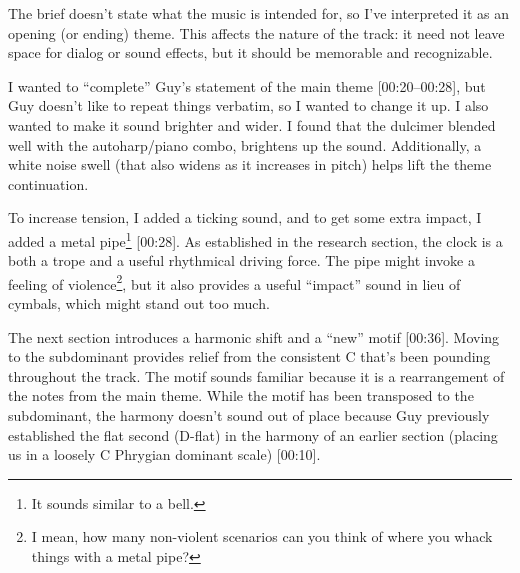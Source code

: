 
%

%
%
%

The brief doesn't state what the music is intended for, so I've interpreted it as an opening (or ending) theme. This affects the nature of the track: it need not leave space for dialog or sound effects, but it should be memorable and recognizable.

I wanted to ``complete'' Guy's statement of the main theme [00:20--00:28], but Guy doesn't like to repeat things verbatim, so I wanted to change it up. I also wanted to make it sound brighter and wider. I found that the dulcimer blended well with the autoharp/piano combo, brightens up the sound. Additionally, a white noise swell (that also widens as it increases in pitch) helps lift the theme continuation.

To increase tension, I added a ticking sound, and to get some extra impact, I added a metal pipe\footnote{It sounds similar to a bell.}  [00:28]. As established in the research section, the clock is a both a trope and a useful rhythmical driving force. The pipe might invoke a feeling of violence\footnote{I mean, how many non-violent scenarios can you think of where you whack things with a metal pipe?}, but it also provides a useful ``impact'' sound in lieu of cymbals, which might stand out too much.

The next section introduces a harmonic shift and a ``new'' motif [00:36]. Moving to the subdominant provides relief from the consistent C that's been pounding throughout the track. The motif sounds familiar because it is a rearrangement of the notes from the main theme. While the motif has been transposed to the subdominant, the harmony doesn't sound out of place because Guy previously established the flat second (D-flat) in the harmony of an earlier section (placing us in a loosely C Phrygian dominant scale) [00:10].

